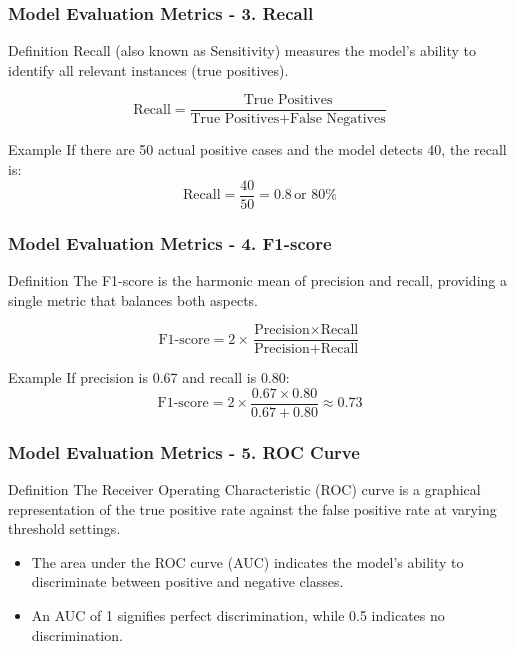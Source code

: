 \documentclass[aspectratio=169]{beamer}
\begin{document}
\begin{frame}[fragile]
    \frametitle{Model Evaluation Metrics - 3. Recall}
    \begin{block}{Definition}
        Recall (also known as Sensitivity) measures the model's ability to identify all relevant instances (true positives).
    \end{block}
    
    \begin{equation}
        \text{Recall} = \frac{\text{True Positives}}{\text{True Positives} + \text{False Negatives}}
    \end{equation}
    
    \begin{block}{Example}
        If there are 50 actual positive cases and the model detects 40, the recall is:
        \begin{equation}
            \text{Recall} = \frac{40}{50} = 0.8 \, \text{or } 80\%
        \end{equation}
    \end{block}
\end{frame}

\begin{frame}[fragile]
    \frametitle{Model Evaluation Metrics - 4. F1-score}
    \begin{block}{Definition}
        The F1-score is the harmonic mean of precision and recall, providing a single metric that balances both aspects.
    \end{block}
    
    \begin{equation}
        \text{F1-score} = 2 \times \frac{\text{Precision} \times \text{Recall}}{\text{Precision} + \text{Recall}}
    \end{equation}
    
    \begin{block}{Example}
        If precision is 0.67 and recall is 0.80:
        \begin{equation}
            \text{F1-score} = 2 \times \frac{0.67 \times 0.80}{0.67 + 0.80} \approx 0.73
        \end{equation}
    \end{block}
\end{frame}

\begin{frame}[fragile]
    \frametitle{Model Evaluation Metrics - 5. ROC Curve}
    \begin{block}{Definition}
        The Receiver Operating Characteristic (ROC) curve is a graphical representation of the true positive rate against the false positive rate at varying threshold settings.
    \end{block}
    
    \begin{itemize}
        \item The area under the ROC curve (AUC) indicates the model's ability to discriminate between positive and negative classes.
        \item An AUC of 1 signifies perfect discrimination, while 0.5 indicates no discrimination.
    \end{itemize}
\end{frame}
\end{document}
